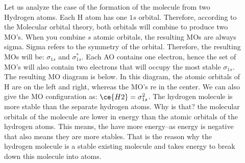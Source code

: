\documentclass[main.tex]{subfiles}
\begin{document}
\begin{description}
\item[] Let us analyze the case of the formation of the  molecule from two Hydrogen atoms. Each H atom has one $1s$ orbital. Therefore, according to the Molecular orbital theory, both orbitals will combine to produce two MO's. When you combine $s$ atomic orbitals, the resulting MOs are always sigma. Sigma refers to the symmetry of the orbital. Therefore, the resulting MOs will be: $\sigma_{1s}$ and $\sigma_{1s}^*$. Each AO contains one electron, hence the set of MO's will also contain two electrons that will occupy the most stable $\sigma_{1s}$. The resulting MO diagram is below. In this diagram, the atomic orbitals of H are on the left and right, whereas the MO's re in the center. We can also give the MO configuration as: $\ce{H2}=\sigma_{1s}^2$. The hydrogen molecule is more stable than the separate hydrogen atoms. Why is that? the molecular orbitals of the molecule are lower in energy than the atomic orbitals of the hydrogen atoms. This means, the have more energy--as energy is negative that also means they are more stables. That is the reason why the hydrogen molecule is a stable existing molecule and takes energy to break down this molecule into atoms.
\begin{center}
\end{center}
\end{description}
\end{document}
